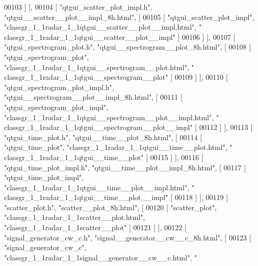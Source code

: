 \begin{DoxyCode}
00103     ] ],
00104     [ \textcolor{stringliteral}{"qtgui\_scatter\_plot\_impl.h"}, \textcolor{stringliteral}{"qtgui\_\_scatter\_\_plot\_\_impl\_8h.html"}, [
00105       [ \textcolor{stringliteral}{"qtgui\_scatter\_plot\_impl"}, \textcolor{stringliteral}{"classgr\_1\_1radar\_1\_1qtgui\_\_scatter\_\_plot\_\_impl.html"}, \textcolor{stringliteral}{"
      classgr\_1\_1radar\_1\_1qtgui\_\_scatter\_\_plot\_\_impl"} ]
00106     ] ],
00107     [ \textcolor{stringliteral}{"qtgui\_spectrogram\_plot.h"}, \textcolor{stringliteral}{"qtgui\_\_spectrogram\_\_plot\_8h.html"}, [
00108       [ \textcolor{stringliteral}{"qtgui\_spectrogram\_plot"}, \textcolor{stringliteral}{"classgr\_1\_1radar\_1\_1qtgui\_\_spectrogram\_\_plot.html"}, \textcolor{stringliteral}{"
      classgr\_1\_1radar\_1\_1qtgui\_\_spectrogram\_\_plot"} ]
00109     ] ],
00110     [ \textcolor{stringliteral}{"qtgui\_spectrogram\_plot\_impl.h"}, \textcolor{stringliteral}{"qtgui\_\_spectrogram\_\_plot\_\_impl\_8h.html"}, [
00111       [ \textcolor{stringliteral}{"qtgui\_spectrogram\_plot\_impl"}, \textcolor{stringliteral}{"classgr\_1\_1radar\_1\_1qtgui\_\_spectrogram\_\_plot\_\_impl.html"}, \textcolor{stringliteral}{"
      classgr\_1\_1radar\_1\_1qtgui\_\_spectrogram\_\_plot\_\_impl"} ]
00112     ] ],
00113     [ \textcolor{stringliteral}{"qtgui\_time\_plot.h"}, \textcolor{stringliteral}{"qtgui\_\_time\_\_plot\_8h.html"}, [
00114       [ \textcolor{stringliteral}{"qtgui\_time\_plot"}, \textcolor{stringliteral}{"classgr\_1\_1radar\_1\_1qtgui\_\_time\_\_plot.html"}, \textcolor{stringliteral}{"
      classgr\_1\_1radar\_1\_1qtgui\_\_time\_\_plot"} ]
00115     ] ],
00116     [ \textcolor{stringliteral}{"qtgui\_time\_plot\_impl.h"}, \textcolor{stringliteral}{"qtgui\_\_time\_\_plot\_\_impl\_8h.html"}, [
00117       [ \textcolor{stringliteral}{"qtgui\_time\_plot\_impl"}, \textcolor{stringliteral}{"classgr\_1\_1radar\_1\_1qtgui\_\_time\_\_plot\_\_impl.html"}, \textcolor{stringliteral}{"
      classgr\_1\_1radar\_1\_1qtgui\_\_time\_\_plot\_\_impl"} ]
00118     ] ],
00119     [ \textcolor{stringliteral}{"scatter\_plot.h"}, \textcolor{stringliteral}{"scatter\_\_plot\_8h.html"}, [
00120       [ \textcolor{stringliteral}{"scatter\_plot"}, \textcolor{stringliteral}{"classgr\_1\_1radar\_1\_1scatter\_\_plot.html"}, \textcolor{stringliteral}{"classgr\_1\_1radar\_1\_1scatter\_\_plot"} ]
00121     ] ],
00122     [ \textcolor{stringliteral}{"signal\_generator\_cw\_c.h"}, \textcolor{stringliteral}{"signal\_\_generator\_\_cw\_\_c\_8h.html"}, [
00123       [ \textcolor{stringliteral}{"signal\_generator\_cw\_c"}, \textcolor{stringliteral}{"classgr\_1\_1radar\_1\_1signal\_\_generator\_\_cw\_\_c.html"}, \textcolor{stringliteral}{"
}
\end{DoxyCode}
